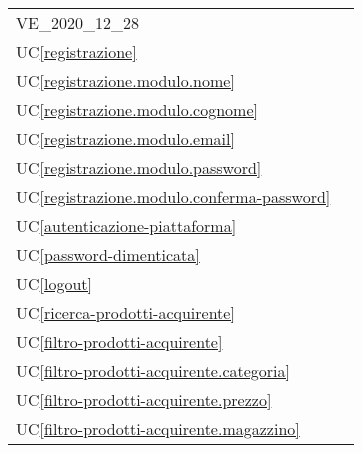 \begin{longtable}{C{6cm} C{6cm}}
	VE\_2020\_12\_28 &  \newline {}  \\

	UC\ref{registrazione} &  \\

	UC\ref{registrazione.modulo.nome} &  \\

    UC\ref{registrazione.modulo.cognome} &  \\

	UC\ref{registrazione.modulo.email} &  \\

    UC\ref{registrazione.modulo.password} &  \\

	UC\ref{registrazione.modulo.conferma-password} &  \\

    UC\ref{autenticazione-piattaforma} &  \\

    UC\ref{password-dimenticata} &  \\

	UC\ref{logout} &  \\

    UC\ref{ricerca-prodotti-acquirente} &  \\

	UC\ref{filtro-prodotti-acquirente} &  \\

    UC\ref{filtro-prodotti-acquirente.categoria} &  \\

	UC\ref{filtro-prodotti-acquirente.prezzo} &  \\

    UC\ref{filtro-prodotti-acquirente.magazzino} &  \\


\end{longtable}
